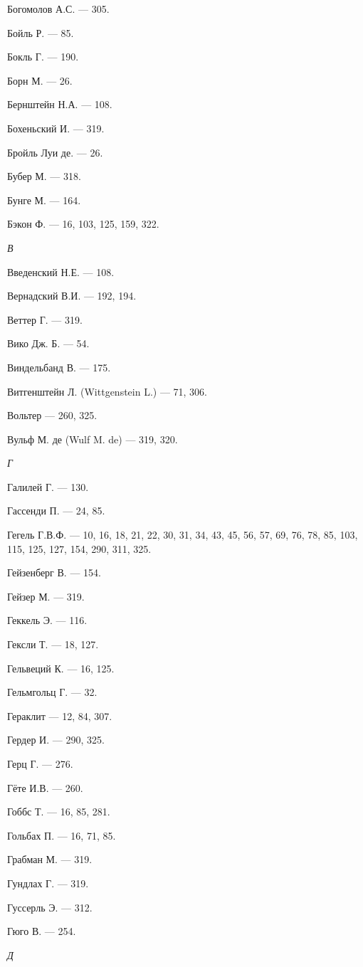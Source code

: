\documentclass[a4paper,14pt,russian]{extreport}
\begin{document}
Богомолов А.С. --- 305.

Бойль Р. --- 85.

Бокль Г. --- 190.

Борн М. --- 26.

Бернштейн Н.А. --- 108.

Бохеньский И. --- 319.

Бройль Луи де. --- 26.

Бубер М. --- 318.

Бунге М. --- 164.

Бэкон Ф. --- 16, 103, 125, 159, 322.

\emph{В}

Введенский Н.Е. --- 108.

Вернадский В.И. --- 192, 194.

Веттер Г. --- 319.

Вико Дж. Б. --- 54.

Виндельбанд В. --- 175.

Витгенштейн Л. (Wittgenstein L.) --- 71, 306.

Вольтер --- 260, 325.

Вульф М. де (Wulf M. de) --- 319, 320.

\emph{Г}

Галилей Г. --- 130.

Гассенди П. --- 24, 85.

Гегель Г.В.Ф. --- 10, 16, 18, 21, 22, 30, 31, 34, 43, 45, 56, 57, 69, 76, 78, 85, 103, 115, 125, 127, 154, 290, 311, 325.

Гейзенберг В. --- 154.

Гейзер М. --- 319.

Геккель Э. --- 116.

Гексли Т. --- 18, 127.

Гельвеций К. --- 16, 125.

Гельмгольц Г. --- 32.

Гераклит --- 12, 84, 307.

Гердер И. --- 290, 325.

Герц Г. --- 276.

Гёте И.В. --- 260.

Гоббс Т. --- 16, 85, 281.

Гольбах П. --- 16, 71, 85.

Грабман М. --- 319.

Гундлах Г. --- 319.

Гуссерль Э. --- 312.

Гюго В. --- 254.

\emph{Д}
\end{document}
